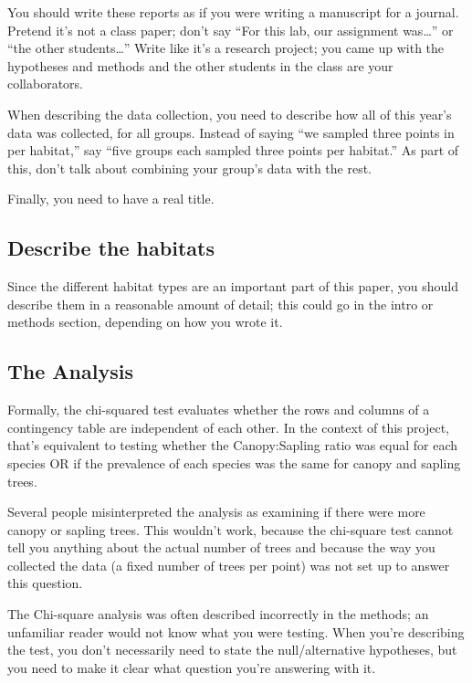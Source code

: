 \documentclass[]{book}
\begin{document}
You should write these reports as if you were writing a manuscript for a
journal. Pretend it's not a class paper; don't say ``For this lab, our
assignment was\ldots{}'' or ``the other students\ldots{}'' Write like
it's a research project; you came up with the hypotheses and methods and
the other students in the class are your collaborators.

When describing the data collection, you need to describe how all of
this year's data was collected, for all groups. Instead of saying ``we
sampled three points in per habitat,'' say ``five groups each sampled
three points per habitat.'' As part of this, don't talk about combining
your group's data with the rest.

Finally, you need to have a real title.

\subsection{Describe the habitats}\label{describe-the-habitats}

Since the different habitat types are an important part of this paper,
you should describe them in a reasonable amount of detail; this could go
in the intro or methods section, depending on how you wrote it.

\subsection{The Analysis}\label{the-analysis}

Formally, the chi-squared test evaluates whether the rows and columns of
a contingency table are independent of each other. In the context of
this project, that's equivalent to testing whether the Canopy:Sapling
ratio was equal for each species OR if the prevalence of each species
was the same for canopy and sapling trees.

Several people misinterpreted the analysis as examining if there were
more canopy or sapling trees. This wouldn't work, because the chi-square
test cannot tell you anything about the actual number of trees and
because the way you collected the data (a fixed number of trees per
point) was not set up to answer this question.

The Chi-square analysis was often described incorrectly in the methods;
an unfamiliar reader would not know what you were testing. When you're
describing the test, you don't necessarily need to state the
null/alternative hypotheses, but you need to make it clear what question
you're answering with it.
\end{document}
